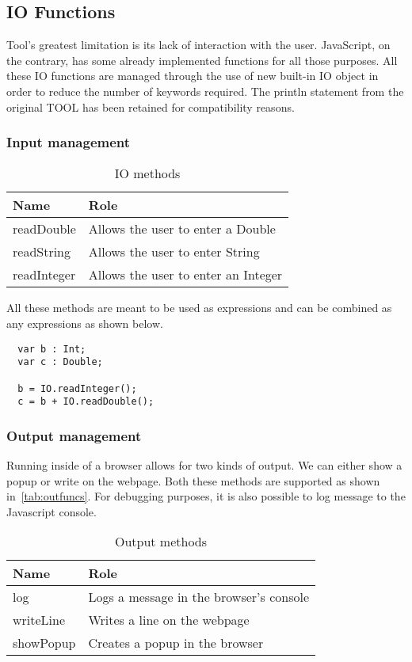 \subsection{IO Functions}
Tool's greatest limitation is its lack of interaction with the
user. JavaScript, on the  contrary, has some already implemented
functions for all those purposes. All these IO functions are managed
through the use of new built-in IO object in order to reduce the
number of keywords required. The println statement from the original
TOOL has been retained for compatibility reasons.

\subsubsection{Input management}

\begin{table}[h!]
  \centering
  \begin{tabular}{ll}
    \toprule
    Name & Role \\
    \midrule
    readDouble & Allows the user to enter a Double \\
    readString & Allows the user to enter String \\
    readInteger & Allows the user to enter an Integer \\
  \end{tabular}
  \caption{IO methods}
  \label{tab:infuncs}
\end{table}

All these methods are meant to be used as expressions and can be
combined as any expressions as shown below.

\begin{lstlisting}
  var b : Int;
  var c : Double;

  b = IO.readInteger();
  c = b + IO.readDouble();
\end{lstlisting}

\subsubsection{Output management}

Running inside of a browser allows for two kinds of output. We can
either show a popup or write on the webpage. Both these methods are
supported as shown in~\autoref{tab:outfuncs}. For debugging purposes,
it is also possible to log message to the Javascript console.

\begin{table}[h!]
  \centering
  \begin{tabular}{ll}
    \toprule
    Name & Role \\
    \midrule
    log & Logs a message in the browser's console \\
    writeLine & Writes a line on the webpage \\
    showPopup & Creates a popup in the browser \\
  \end{tabular}
  \caption{Output methods}
  \label{tab:outfuncs}
\end{table}

